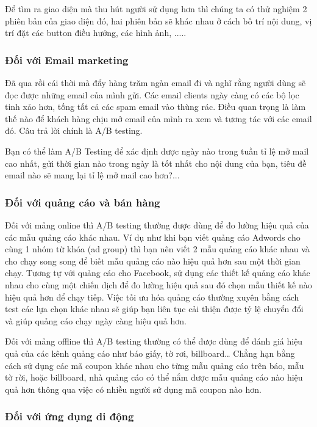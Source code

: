 Để tìm ra giao diện mà thu hút người sử dụng hơn thì chúng ta có thử nghiệm 2 phiên bản của giao diện đó, hai phiên bản sẽ khác nhau ở cách bố trí nội dung, vị trí đặt các button điều hướng, các hình ảnh, .....

\subsubsection{Đối với Email marketing}

Đã qua rồi cái thời mà đẩy hàng trăm ngàn email đi và nghĩ rằng người dùng sẽ đọc được những email của mình gửi. Các email clients ngày càng có các bộ lọc tinh xảo hơn, tống tất cả các spam email vào thùng rác. Điều quan trọng là làm thế nào để khách hàng chịu mở email của mình ra xem và tương tác với các email đó. Câu trả lời chính là A/B testing.

Bạn có thể làm A/B Testing để xác định được ngày nào trong tuần tỉ lệ mở mail cao nhất, gửi thời gian nào trong ngày là tốt nhất cho nội dung của bạn, tiêu đề email nào sẽ mang lại tỉ lệ mở mail cao hơn?...

\subsubsection{Đối với quảng cáo và bán hàng}

Đối với mảng online thì A/B testing thường được dùng để đo lường hiệu quả của các mẫu quảng cáo khác nhau. Ví dụ như khi bạn viết quảng cáo Adwords cho cùng 1 nhóm từ khóa (ad group) thì bạn nên viết 2 mẫu quảng cáo khác nhau và cho chạy song song để biết mẫu quảng cáo nào hiệu quả hơn sau một thời gian chạy. Tương tự với quảng cáo cho Facebook, sử dụng các thiết kế quảng cáo khác nhau cho cùng một chiến dịch để đo lường hiệu quả sau đó chọn mẫu thiết kế nào hiệu quả hơn để chạy tiếp. Việc tối ưu hóa quảng cáo thường xuyên bằng cách test các lựa chọn khác nhau sẽ giúp bạn liên tục cải thiện được tỷ lệ chuyển đổi và giúp quảng cáo chạy ngày càng hiệu quả hơn.

Đối với mảng offline thì A/B testing thường có thể được dùng để đánh giá hiệu quả của các kênh quảng cáo như báo giấy, tờ rơi, billboard… Chẳng hạn bằng cách sử dụng các mã coupon khác nhau cho từng mẫu quảng cáo trên báo, mẫu tờ rời, hoặc billboard, nhà quảng cáo có thể nắm được mẫu quảng cáo nào hiệu quả hơn thông qua việc có nhiều người sử dụng mã coupon nào hơn.

\subsubsection{Đối với ứng dụng di động}

